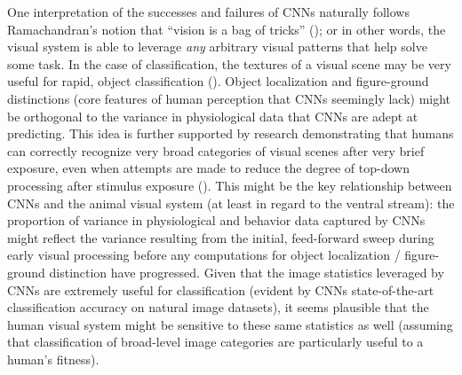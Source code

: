 \documentclass[12pt]{article}
\let\oldcite=\cite
\renewcommand{\cite}[1]{\textcolor[rgb]{0, .121, .388}{\oldcite{#1}}}
\begin{document}
One interpretation of the successes and failures of CNNs naturally follows
Ramachandran's notion that ``vision is a bag of tricks'' (\cite{ramachandran1985neurobiology}); or in other words, the visual system is able to leverage \emph{any} arbitrary visual patterns that help solve some task. In the case of classification, the textures of a visual scene may be very useful for rapid, object classification (\cite{serre2007feedforward,rousselet2005long,loschky2010natural}). Object localization and figure-ground distinctions (core features of human perception that CNNs seemingly lack) might be orthogonal to the variance in physiological data that CNNs are adept at predicting. This idea is further supported by research demonstrating that humans can correctly recognize very broad categories of visual scenes after very brief exposure, even when attempts are made to reduce the degree of top-down processing after stimulus exposure (\cite{serre2007feedforward}). This might be the key relationship between CNNs and the animal visual system (at least in regard to the ventral stream): the proportion of variance in physiological and behavior data captured by CNNs might reflect the variance resulting from the initial, feed-forward sweep during early visual processing before any computations for object localization / figure-ground distinction have progressed. Given that the image statistics leveraged by CNNs are extremely useful for classification (evident by CNNs state-of-the-art classification accuracy on natural image datasets), it seems plausible that the human visual system might be sensitive to these same statistics as well (assuming that classification of broad-level image categories are particularly useful to a human's fitness). 
\end{document}
